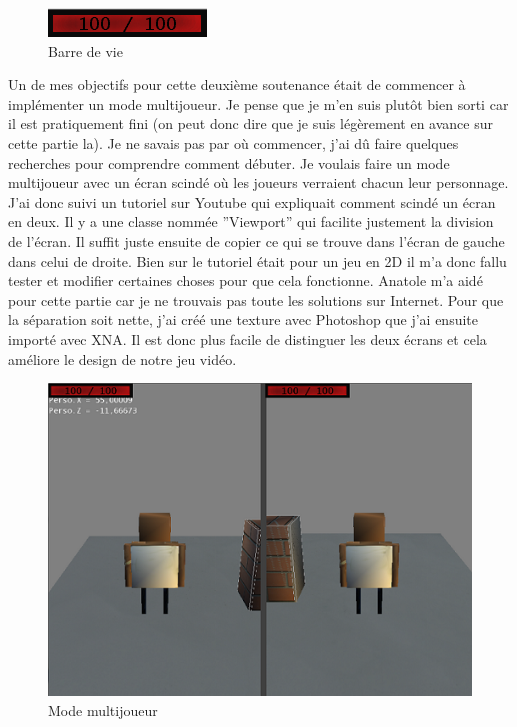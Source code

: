 \documentclass[12pt]{article}
\begin{document}
\begin{figure}[h]
\begin{center}
\includegraphics[scale=1.5]{Barredevie.png}
\caption{Barre de vie}
\end{center}
\end{figure}

Un de mes objectifs pour cette deuxième soutenance était de commencer à implémenter un mode multijoueur. Je pense que je m'en suis plutôt bien sorti car il est pratiquement fini (on peut donc dire que je suis légèrement en avance sur cette partie la). Je ne savais pas par où commencer, j'ai dû faire quelques recherches pour comprendre comment débuter. Je voulais faire un mode multijoueur avec un écran scindé où les joueurs verraient chacun leur personnage. J'ai donc suivi un tutoriel sur Youtube qui expliquait comment scindé un écran en deux. Il y a une classe nommée ''Viewport'' qui facilite justement la division de l'écran. Il suffit juste ensuite de copier ce qui se trouve dans l'écran de gauche dans celui de droite. Bien sur le tutoriel était pour un jeu en 2D il m'a donc fallu tester et modifier certaines choses pour que cela fonctionne. Anatole m'a aidé pour cette partie car je ne trouvais pas toute les solutions sur Internet. Pour que la séparation soit nette, j'ai créé une texture avec Photoshop que j'ai ensuite importé avec XNA. Il est donc plus facile de distinguer les deux écrans et cela améliore le design de notre jeu vidéo.
\newpage
\begin{figure}
\begin{center}
\includegraphics[scale=1]{Multijoueur.png}
\caption{Mode multijoueur}
\end{center}
\end{figure}
\end{document}
